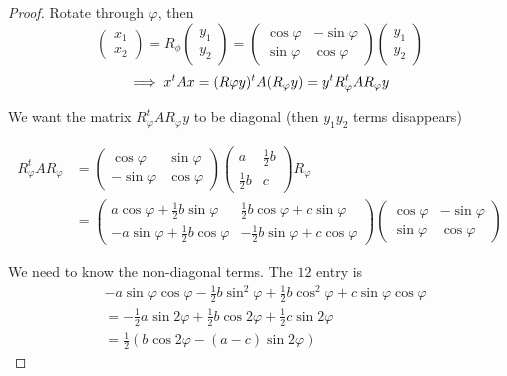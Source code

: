 \documentclass[10pt]{scrartcl}
\begin{document}
\begin{proof}
Rotate through $\varphi$, then 
\[
  \begin{pmatrix}
  x_1 \\ x_2	
  \end{pmatrix} = R_\phi\begin{pmatrix}
y_1 \\ y_2	
\end{pmatrix} = \begin{pmatrix}
	\cos\varphi & -\sin\varphi\\ \sin\varphi & \cos\varphi 
\end{pmatrix}\begin{pmatrix}
y_1 \\ y_2	
\end{pmatrix}
\]
\[
  \implies x^tAx = (R\varphi y)^tA(R_\varphi y) = y^tR_\varphi^t AR_\varphi y\\
\]

We want the matrix $R_\varphi^t AR_\varphi y$ to be diagonal (then $y_1y_2$ terms disappears) 

\begin{align*}
  R_\varphi^tAR_\varphi &= \begin{pmatrix}
 \cos\varphi & \sin\varphi \\ -\sin\varphi & \cos\varphi 	
 \end{pmatrix}\begin{pmatrix}
a & \frac{1}{2}b \\ \frac{1}{2}b & c 	
\end{pmatrix}R_\varphi\\
&= 
\begin{pmatrix}
a \cos\varphi + \frac{1}{2}b\sin\varphi 	& \frac{1}{2}b\cos\varphi + c\sin\varphi\\
-a\sin\varphi + \frac{1}{2}b\cos\varphi & -\frac{1}{2}b\sin\varphi + c\cos\varphi 
\end{pmatrix}\begin{pmatrix}
\cos\varphi & -\sin\varphi\\
\sin\varphi & \cos\varphi 	
\end{pmatrix}
\end{align*}

We need to know the non-diagonal terms. The $12$ entry is 
\begin{align*}
 &-a\sin\varphi\cos\varphi - \frac{1}{2}b\sin^2\varphi + \frac{1}{2}b\cos^2\varphi + c\sin\varphi\cos\varphi\\
 &= -\frac{1}{2}a\sin2\varphi + \frac{1}{2}b\cos2\varphi + \frac{1}{2}c\sin2\varphi\\
 &= \frac{1}{2}(b\cos2\varphi - (a-c)\sin2\varphi)
\end{align*}


\end{proof}
\end{document}
